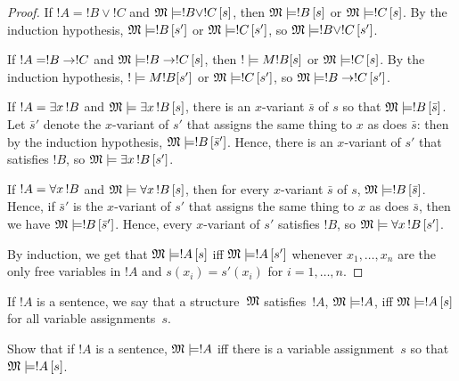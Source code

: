 \documentclass[syntax-and-semantics]{subfiles}
\begin{document}
\begin{proof}
If $!A = !B \lor !C$ and $\Sat{M}{!B \lor !C}[s]$, then $\Sat{M}{!B}[s]$ or $\Sat{M}{!C}[s]$. By the induction hypothesis, $\Sat{M}{!B}[s']$ or $\Sat{M}{!C}[s']$, so $\Sat{M}{!B \lor !C}[s']$.

If $!A = !B \to !C$ and $\Sat{M}{!B \lif !C}[s]$, then $\Sat!{M}{!B}[s]$ or $\Sat{M}{!C}[s]$. By the induction hypothesis, $\Sat!{M}{!B}[s']$ or $\Sat{M}{!C}[s']$, so $\Sat{M}{!B \lif !C}[s']$.

If $!A = \lexists[x][!B]$ and $\Sat{M}{\lexists[x][!B]}[s]$, there is an $x$-variant $\bar{s}$ of $s$ so that $\Sat{M}{!B}[\bar{s}]$. Let $\bar{s}'$ denote the $x$-variant of $s'$ that assigns the same thing to $x$ as does $\bar{s}$: then by the induction hypothesis, $\Sat{M}{!B}[\bar{s}']$. Hence, there is an $x$-variant of $s'$ that satisfies $!B$, so $\Sat{M}{\lexists[x][!B]}[s']$.

If $!A = \lforall[x][!B]$ and $\Sat{M}{\lforall[x][!B]}[s]$, then for every $x$-variant $\bar{s}$ of $s$, $\Sat{M}{!B}[\bar{s}]$. Hence, if $\bar{s}'$ is the $x$-variant of $s'$ that assigns the same thing to $x$ as does $\bar{s}$, then we have $\Sat{M}{!B}[\bar{s}']$. Hence, every $x$-variant of $s'$ satisfies $!B$, so $\Sat{M}{\lforall[x][!B]}[s']$.

By induction, we get that $\Sat{M}{!A}[s]$ iff $\Sat{M}{!A}[s']$ whenever $x_1,\ldots,x_n$ are the only free variables in $!A$ and $s(x_i)=s'(x_i)$ for $i=1,\ldots,n$. 

\end{proof}
 
\begin{defn}
If $!A$ is a sentence, we say that a structure~$\mathfrak M$
satisfies~$!A$, $\Sat{M}{!A}$, iff $\Sat{M}{!A}[s]$ for all variable
assignments~$s$.
\end{defn}

\begin{prob}
Show that if $!A$ is a sentence, $\Sat{M}{!A}$ iff there is a variable
assignment~$s$ so that $\Sat{M}{!A}[s]$.
\end{prob}
\end{document}

